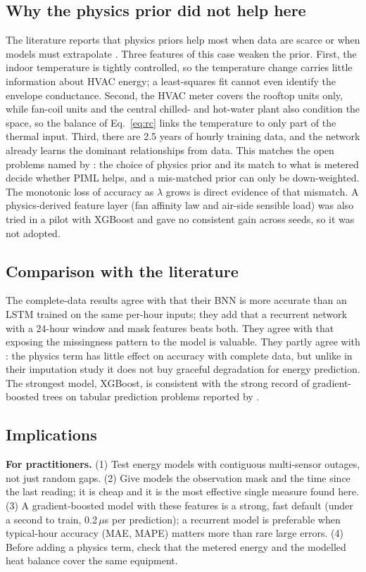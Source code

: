 \subsection{Why the physics prior did not help here}
The literature reports that physics priors help most when data are scarce or when models must extrapolate \citep{gokhale2022pinn,liguori2024opening}. Three features of this case weaken the prior. First, the indoor temperature is tightly controlled, so the temperature change carries little information about HVAC energy; a least-squares fit cannot even identify the envelope conductance. Second, the HVAC meter covers the rooftop units only, while fan-coil units and the central chilled- and hot-water plant also condition the space, so the balance of Eq.~\eqref{eq:rc} links the temperature to only part of the thermal input. Third, there are 2.5 years of hourly training data, and the network already learns the dominant relationships from data. This matches the open problems named by \citet{ma2025review}: the choice of physics prior and its match to what is metered decide whether PIML helps, and a mis-matched prior can only be down-weighted. The monotonic loss of accuracy as $\lambda$ grows is direct evidence of that mismatch. A physics-derived feature layer (fan affinity law and air-side sensible load) was also tried in a pilot with XGBoost and gave no consistent gain across seeds, so it was not adopted.

\subsection{Comparison with the literature}
The complete-data results agree with \citet{mahajan2024bnn} that their BNN is more accurate than an LSTM trained on the same per-hour inputs; they add that a recurrent network with a 24-hour window and mask features beats both. They agree with \citet{che2018grud} that exposing the missingness pattern to the model is valuable. They partly agree with \citet{liguori2024opening}: the physics term has little effect on accuracy with complete data, but unlike in their imputation study it does not buy graceful degradation for energy prediction. The strongest model, XGBoost, is consistent with the strong record of gradient-boosted trees on tabular prediction problems reported by \citet{chen2016xgboost}.

\subsection{Implications}
\textbf{For practitioners.} (1) Test energy models with contiguous multi-sensor outages, not just random gaps. (2) Give models the observation mask and the time since the last reading; it is cheap and it is the most effective single measure found here. (3) A gradient-boosted model with these features is a strong, fast default (under a second to train, 0.2\,$\mu$s per prediction); a recurrent model is preferable when typical-hour accuracy (MAE, MAPE) matters more than rare large errors. (4) Before adding a physics term, check that the metered energy and the modelled heat balance cover the same equipment.


